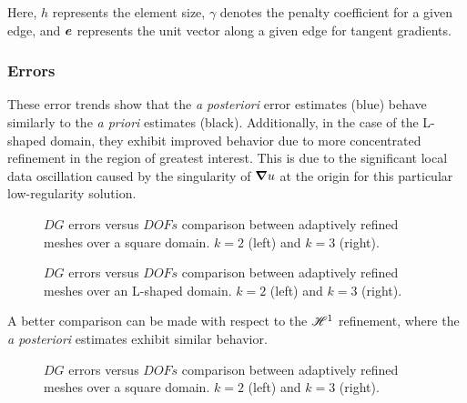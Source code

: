 Here, $h$ represents the element size, $\gamma$ denotes the penalty coefficient for a given edge, and $\bm{e}$ represents the unit vector along a given edge for tangent gradients.

\newpage
\subsubsection{Errors}

These error trends show that the \textit{a posteriori} error estimates (blue) behave similarly to the \textit{a priori} estimates (black). Additionally, in the case of the L-shaped domain, they exhibit improved behavior due to more concentrated refinement in the region of greatest interest. This is due to the significant local data oscillation caused by the singularity of $\bm{\nabla} u$ at the origin for this particular low-regularity solution.

\begin{figure}[!ht]
	\begin{subfigure}[b]{0.45\textwidth}
		
	\end{subfigure}
	\hfill
	\begin{subfigure}[b]{0.45\textwidth}
		
	\end{subfigure}
    \caption{$DG$ errors versus $DOFs$ comparison between adaptively refined meshes over a square domain. $k = 2$ (left) and $k = 3$ (right).}
\end{figure}

\begin{figure}[!ht]
	\begin{subfigure}[b]{0.45\textwidth}
		
	\end{subfigure}
	\hfill
	\begin{subfigure}[b]{0.45\textwidth}
	\end{subfigure}
    \caption{$DG$ errors versus $DOFs$ comparison between adaptively refined meshes over an L-shaped domain. $k = 2$ (left) and $k = 3$ (right).}
\end{figure}

\newpage

A better comparison can be made with respect to the $\mathscr{H}^1$ refinement, where the \textit{a posteriori} estimates exhibit similar behavior.

\begin{figure}[!ht]
	\begin{subfigure}[b]{0.45\textwidth}
		
	\end{subfigure}
	\hfill
	\begin{subfigure}[b]{0.45\textwidth}
		
	\end{subfigure}
    \caption{$DG$ errors versus $DOFs$ comparison between adaptively refined meshes over a square domain. $k = 2$ (left) and $k = 3$ (right).}
\end{figure}

